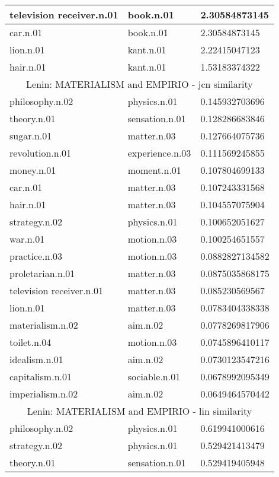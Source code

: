 \begin{center}
\begin{tabular}{ | l | l | l |}
television receiver.n.01 & book.n.01 & 2.30584873145 \\ \hline
car.n.01 & book.n.01 & 2.30584873145 \\ \hline
lion.n.01 & kant.n.01 & 2.22415047123 \\ \hline
hair.n.01 & kant.n.01 & 1.53183374322 \\ \hline
\multicolumn{3}{|c|}{Lenin: MATERIALISM and EMPIRIO - jcn similarity} \\ \hline
philosophy.n.02 & physics.n.01 & 0.145932703696 \\ \hline
theory.n.01 & sensation.n.01 & 0.128286683846 \\ \hline
sugar.n.01 & matter.n.03 & 0.127664075736 \\ \hline
revolution.n.01 & experience.n.03 & 0.111569245855 \\ \hline
money.n.01 & moment.n.01 & 0.107804699133 \\ \hline
car.n.01 & matter.n.03 & 0.107243331568 \\ \hline
hair.n.01 & matter.n.03 & 0.104557075904 \\ \hline
strategy.n.02 & physics.n.01 & 0.100652051627 \\ \hline
war.n.01 & motion.n.03 & 0.100254651557 \\ \hline
practice.n.03 & motion.n.03 & 0.0882827134582 \\ \hline
proletarian.n.01 & matter.n.03 & 0.0875035868175 \\ \hline
television receiver.n.01 & matter.n.03 & 0.085230569567 \\ \hline
lion.n.01 & matter.n.03 & 0.0783404338338 \\ \hline
materialism.n.02 & aim.n.02 & 0.0778269817906 \\ \hline
toilet.n.04 & motion.n.03 & 0.0745896410117 \\ \hline
idealism.n.01 & aim.n.02 & 0.0730123547216 \\ \hline
capitalism.n.01 & sociable.n.01 & 0.0678992095349 \\ \hline
imperialism.n.02 & aim.n.02 & 0.0649464570442 \\ \hline
\multicolumn{3}{|c|}{Lenin: MATERIALISM and EMPIRIO - lin similarity} \\ \hline
philosophy.n.02 & physics.n.01 & 0.619941000616 \\ \hline
strategy.n.02 & physics.n.01 & 0.529421413479 \\ \hline
theory.n.01 & sensation.n.01 & 0.529419405948 \\ \hline

\end{tabular}
\end{center}
